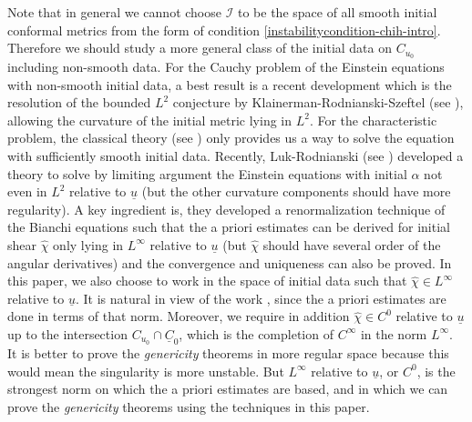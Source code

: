 \documentclass[11pt,reqno]{amsart}
\theoremstyle{definition}
\numberwithin{equation}{section}
\def\chih{\widehat{\chi}}
\def\ub{\underline{u}}
\def\Cb{\underline{C}}
\begin{document}
Note that in general we cannot choose $\mathcal{I}$ to be the space of all smooth initial conformal metrics from the form of condition \eqref{instabilitycondition-chih-intro}. Therefore we should study a more general class of the initial data on $C_{u_0}$ including non-smooth data. For the Cauchy problem of the Einstein equations with non-smooth initial data, a best result is a recent development which is the resolution of the bounded $L^2$ conjecture by Klainerman-Rodnianski-Szeftel (see \cite{K-R-S}), allowing the curvature of the initial metric lying in $L^2$. For the characteristic problem, the classical theory (see \cite{Ren}) only provides us a way to solve the equation with sufficiently smooth initial data. Recently, Luk-Rodnianski (see \cite{L-R1}) developed a theory to solve  by limiting argument the Einstein equations with initial $\alpha$ not even in $L^2$ relative to $\ub$ (but the other curvature components should have more regularity). A key ingredient is, they developed a renormalization technique of the Bianchi equations such that the a priori estimates can be derived for initial shear $\chih$ only lying in $L^\infty$ relative to $\ub$ (but $\chih$ should have several order of the angular derivatives) and the convergence and uniqueness can also be proved. In this paper, we also choose to work in the space of initial data such that $\chih\in L^\infty$ relative to $\ub$. It is natural in view of the work \cite{L-R1, An-Luk}, since the a priori estimates are done in terms of that norm. Moreover, we require in addition $\chih\in C^0$ relative to $\ub$ up to the intersection $C_{u_0}\cap \Cb_0$, which is the completion of $C^\infty$ in the norm $L^\infty$. It is better to prove the \emph{genericity} theorems in more regular space because this would mean the singularity is more unstable. But $L^\infty$ relative to $\ub$, or $C^0$, is the strongest norm on which the a priori estimates are based, and in which we can prove the \emph{genericity} theorems using the techniques in this paper.
\end{document}
